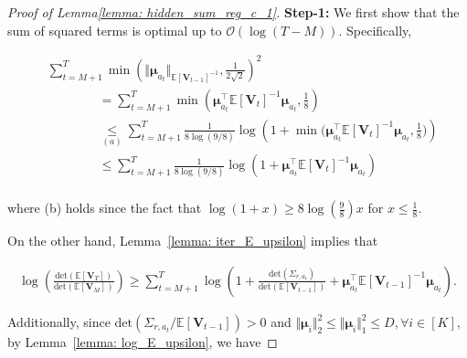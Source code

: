 \begin{proof}[Proof of Lemma\ref{lemma: hidden_sum_reg_c_1}]

\textbf{Step-1:}
We first show that the sum of squared terms is optimal up to $\mathcal{O}(\log(T-M))$. Specifically,

\begin{equation}
\begin{aligned}
\label{eq: term1_squared_hidden}
& \sum_{t=M+1}^{T} \min \left(
\Vert \boldsymbol{\mu}_{a_t} \Vert_{\mathbb{E}\left[\boldsymbol{V}_{t-1}\right]^{-1}}, 
\frac{1}{2\sqrt{2}}
\right)^2 \\
& \qquad \qquad =
\sum_{t=M+1}^{T} \min \left( \boldsymbol{\mu}_{a_t}^{\top} \mathbb{E}[\boldsymbol{V}_t]^{-1} \boldsymbol{\mu}_{a_t}, \frac{1}{8} \right) \\
& \qquad \qquad \underset{(a)}{\leq} 
\sum_{t=M+1}^{T} \frac{1}{8 \log(9/8)} \log \left( 1 + \min \big( \boldsymbol{\mu}_{a_t}^{\top} \mathbb{E}[\boldsymbol{V}_t]^{-1} \boldsymbol{\mu}_{a_t}, \frac{1}{8} \big) \right) \\
& \qquad \qquad \leq 
\sum_{t=M+1}^{T} \frac{1}{8 \log(9/8)} \log \left( 1 + \boldsymbol{\mu}_{a_t}^{\top} \mathbb{E}[\boldsymbol{V}_t]^{-1} \boldsymbol{\mu}_{a_t} \right) \\
\end{aligned}
\end{equation}

where (b) holds since the fact that $\log(1+x) \geq 8 \log \left( \frac{9}{8} \right)x$ for $x \leq \frac{1}{8}$.

On the other hand, Lemma~\ref{lemma: iter_E_upsilon} implies that 

\begin{equation}
\begin{aligned}
\log \left( \frac{ \text{det} \left(\mathbb{E}[\boldsymbol{V}_{T}] \right) }{ \text{det} \left(\mathbb{E}[\boldsymbol{V}_{M}] \right)} \right) 
\geq 
\sum_{t=M+1}^{T} 
\log \left(
1 + \frac{\text{det} \left( \Sigma_{r,a_t} \right)}{\text{det} \left( \mathbb{E}[\boldsymbol{V}_{t-1}] \right) }
+ 
\boldsymbol{\mu}_{a_t}^{\top} \mathbb{E}[\boldsymbol{V}_{t-1}]^{-1} \boldsymbol{\mu}_{a_t}
\right).
\end{aligned}
\end{equation}

Additionally, since $\text{det} \left( \Sigma_{r,a_t} / \mathbb{E}[\boldsymbol{V}_{t-1}] \right) > 0$ and $\Vert \boldsymbol{\mu}_{i} \Vert_2^2 \leq \Vert \boldsymbol{\mu}_{i} \Vert_1^2 \leq D, \forall i \in [K]$, by Lemma~\ref{lemma: log_E_upsilon}, we have 


\end{proof}

